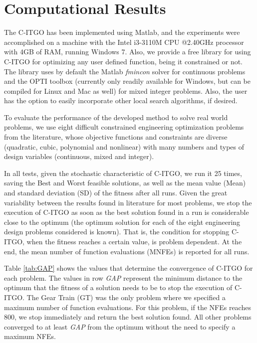 \section{Computational Results} \label{sec:Results}

The C-ITGO has been implemented using Matlab, and the experiments were accomplished on a machine with the Intel i3-3110M CPU @2.40GHz processor with 4GB of RAM, running Windows 7. Also, we provide a free library for using C-ITGO for optimizing any user defined function, being it constrained or not. The library uses by default the Matlab \textit{fmincon} solver for continuous problems and the OPTI toolbox (currently only readily available for Windows, but can be compiled for Linux and Mac as well) for mixed integer problems. Also, the user has the option to easily incorporate other local search algorithms, if desired.


To evaluate the performance of the developed method to solve real world problems, we use eight difficult constrained engineering optimization problems from the literature, whose objective functions and constraints are diverse (quadratic, cubic, polynomial and nonlinear) with many numbers and types of design variables (continuous, mixed and integer). 

In all tests, given the stochastic characteristic of C-ITGO, we run it 25 times, saving the Best and Worst feasible solutions, as well as the mean value (Mean) and standard deviation (SD) of the fitness after all runs. Given the great variability between the results found in literature for most problems, we stop the execution of C-ITGO as soon as the best solution found in a run is considerable close to the optimum (the optimum solution for each of the eight engineering design problems considered is known). That is, the condition for stopping C-ITGO, when the fitness reaches a certain value, is problem dependent. At the end, the mean number of function evaluations (MNFEs) is reported for all runs.

Table \ref{tab:GAP} shows the values that determine the convergence of C-ITGO for each problem. The values in row \textit{GAP} represent the minimum distance to the optimum that the fitness of a solution needs to be to stop the execution of C-ITGO. The Gear Train (GT) was the only problem where we specified a maximum number of function evaluations. For this problem, if the NFEs reaches 800, we stop immediately and return the best solution found. All other problems converged to at least \textit{GAP} from the optimum without the need to specify a maximum NFEs.


